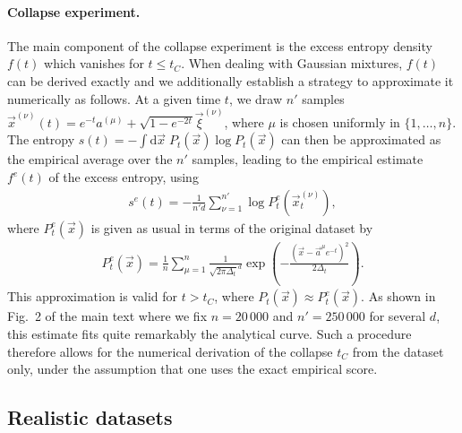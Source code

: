 \documentclass[10pt,twocolumn]{article}
\begin{document}
\paragraph*{Collapse experiment.} The main component of the collapse experiment is the excess entropy density $f(t)$ which vanishes for $t \leq t_C$. When dealing with Gaussian mixtures, $f(t)$ can be derived exactly and we additionally establish a strategy to approximate it numerically as follows. At a given time $t$, we draw $n'$ samples $\vec x^{(\nu)}(t) = e^{-t} a^{(\mu)} + \sqrt{1-e^{-2t}} \vec \xi^{(\nu)}$, where $\mu$ is chosen uniformly in $\{1, \ldots, n\}$. The entropy $s(t) = -\int \mathrm{d} \vec x \; P_t(\vec x) \log P_t(\vec x)$ can then be approximated as the empirical average over the $n'$ samples, leading to the empirical estimate $f^e(t)$ of the excess entropy, using
\begin{align}
s^e(t)=-\frac{1}{n'd}\sum_{\nu=1}^{n'}\log P^e_t\left(\vec x_t^{(\nu)}\right),
\end{align}
where $P_t^e(\vec x)$ is given as usual in terms of the original dataset by
\begin{align}
P_t^e(\vec x)=\frac{1}{n}\sum_{\mu=1}^n \frac{1}{\sqrt{2\pi \Delta_t}^d}\exp\left(-\frac{(\vec x-\vec a^\mu e^{-t})^2}{2\Delta_t}\right).
\end{align}
This approximation is valid for $t>t_C$, where $P_t(\vec x) \approx P_t^e(\vec x)$.
As shown in Fig.~2 of the main text where we fix $n=20\,000$ and $n'=250\,000$ for several $d$, this estimate fits quite remarkably the analytical curve. Such a procedure therefore allows for the numerical derivation of the collapse $t_C$ from the dataset only, under the assumption that one uses the  exact empirical score.

\subsection{Realistic datasets} \label{sect:exp_real}
\end{document}

